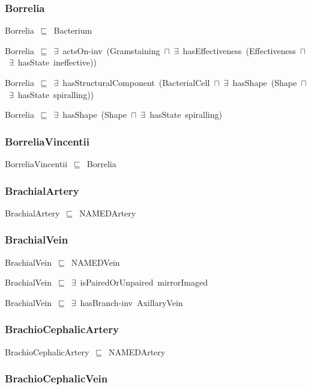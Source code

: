 \documentclass{article}
\begin{document}
\subsubsection*{Borrelia}

Borrelia~\ensuremath{\sqsubseteq}~Bacterium~

Borrelia~\ensuremath{\sqsubseteq}~\ensuremath{\exists}~actsOn-inv~(Gramstaining~\ensuremath{\sqcap}~\ensuremath{\exists}~hasEffectiveness~(Effectiveness~\ensuremath{\sqcap}~\ensuremath{\exists}~hasState~ineffective))~

Borrelia~\ensuremath{\sqsubseteq}~\ensuremath{\exists}~hasStructuralComponent~(BacterialCell~\ensuremath{\sqcap}~\ensuremath{\exists}~hasShape~(Shape~\ensuremath{\sqcap}~\ensuremath{\exists}~hasState~spiralling))~

Borrelia~\ensuremath{\sqsubseteq}~\ensuremath{\exists}~hasShape~(Shape~\ensuremath{\sqcap}~\ensuremath{\exists}~hasState~spiralling)~

\subsubsection*{BorreliaVincentii}

BorreliaVincentii~\ensuremath{\sqsubseteq}~Borrelia~

\subsubsection*{BrachialArtery}

BrachialArtery~\ensuremath{\sqsubseteq}~NAMEDArtery~

\subsubsection*{BrachialVein}

BrachialVein~\ensuremath{\sqsubseteq}~NAMEDVein~

BrachialVein~\ensuremath{\sqsubseteq}~\ensuremath{\exists}~isPairedOrUnpaired~mirrorImaged~

BrachialVein~\ensuremath{\sqsubseteq}~\ensuremath{\exists}~hasBranch-inv~AxillaryVein~

\subsubsection*{BrachioCephalicArtery}

BrachioCephalicArtery~\ensuremath{\sqsubseteq}~NAMEDArtery~

\subsubsection*{BrachioCephalicVein}
\end{document}
